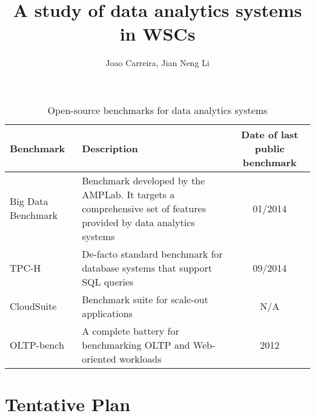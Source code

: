 \documentclass[10pt,twocolumn]{article}
\begin{document}
\title{{\bf A study of data analytics systems in WSCs}}
\author[1]{{Joao Carreira, Jian Neng Li}}
\date{}
\maketitle

\begin{table}[b]
\begin{minipage}{\textwidth}
\centering
\begin{tabular}{|l|p{8cm}|c|}
\hline
Benchmark & Description & Date of last public benchmark\\\hline
    Big Data Benchmark~\cite{bigdata_benchmark}  & Benchmark developed by the AMPLab. It targets a comprehensive set of features provided by data analytics systems & 01/2014 \\\hline
    TPC-H~\cite{tpc_h}  & De-facto standard benchmark for database systems that support SQL queries & 09/2014 \\\hline
    CloudSuite~\cite{cloudsuite}  & Benchmark suite for scale-out applications & N/A \\\hline
    OLTP-bench~\cite{oltp_bench}  & A complete battery for benchmarking OLTP and Web-oriented workloads  & 2012 \\\hline
\end{tabular}
\label{table1}
\caption{Open-source benchmarks for data analytics systems}
\end{minipage}

\end{table}


\begin{abstract}
\noindent

\end{abstract}

\section{Tentative Plan}





\end{document}
